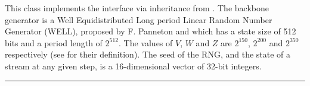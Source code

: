 
This class implements the  interface via inheritance from
. The backbone generator is a Well Equidistributed
Long period Linear Random Number Generator (WELL), proposed by F.
 Panneton\html{,} and which has a state size
of 512 bits and a period length of 
\latex{$\rho\approx$} $2^{512}$. The values of $V$, $W$ and $Z$ are $2^{150}$,
$2^{200}$ and $2^{350}$ respectively (see  for their
definition). The seed of the RNG, and the state of a stream at any given
step, is a 16-dimensional vector of 32-bit integers.



\bigskip\hrule

